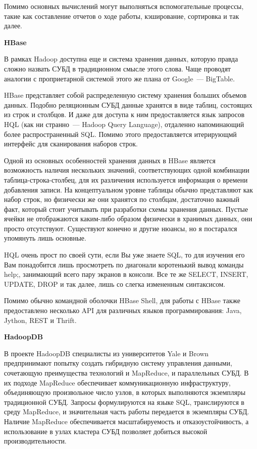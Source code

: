 Помимо основных вычислений могут выполняться вспомогательные процессы, такие как составление отчетов о ходе работы, кэширование, 
сортировка и так далее.

\textbf{HBase}

В рамках Hadoop доступна еще и система хранения данных, которую правда сложно назвать СУБД в традиционном смысле этого слова. 
Чаще проводят аналогии с проприетарной системой этого же плана от Google~--- BigTable.

HBase представляет собой распределенную систему хранения больших объемов данных. Подобно реляционным СУБД данные хранятся в 
виде таблиц, состоящих из строк и столбцов. И даже для доступа к ним предоставляется язык запросов HQL (как ни странно~--- 
Hadoop Query Language), отдаленно напоминающий более распространенный SQL. Помимо этого предоставляется итерирующмй интерфейс 
для сканирования наборов строк.

Одной из основных особенностей хранения данных в HBase является возможность наличия нескольких значений, 
соответствующих одной комбинации таблица-строка-столбец, для их различения используется информация о времени добавления записи. 
На концептуальном уровне таблицы обычно представляют как набор строк, но физически же они хранятся по столбцам, достаточно 
важный факт, который стоит учитывать при разработки схемы хранения данных. Пустые ячейки не отображаются каким-либо образом 
физически в хранимых данных, они просто отсутствуют. Существуют конечно и другие нюансы, но я постарался упомянуть лишь основные.

HQL очень прост по своей сути, если Вы уже знаете SQL, то для изучения его Вам понадобится лишь просмотреть по диагонали 
коротенький вывод команды help;, занимающий всего пару экранов в консоли. Все те же SELECT, INSERT, UPDATE, DROP и так далее, 
лишь со слегка измененным синтаксисом.

Помимо обычно командной оболочки HBase Shell, для работы с HBase также предоставлено несколько API для различных языков 
программирования: Java, Jython, REST и Thrift.

\textbf{HadoopDB}

В проекте HadoopDB специалисты из университетов Yale и Brown предпринимают попытку создать гибридную систему управления 
данными, сочетающую преимущества технологий и MapReduce, и параллельных СУБД. В их подходе MapReduce обеспечивает коммуникационную 
инфраструктуру, объединяющую произвольное число узлов, в которых выполняются экземпляры традиционной СУБД. Запросы формулируются 
на языке SQL, транслируются в среду MapReduce, и значительная часть работы передается в экземпляры СУБД. Наличие MapReduce 
обеспечивается масштабируемость и отказоустойчивость, а использование в узлах кластера СУБД позволяет добиться высокой 
производительности. 